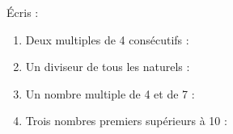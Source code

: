 %
%
    Écris :
    \begin{enumerate}[itemsep=1em]
        \item Deux multiples de 4 consécutifs :
        \item Un diviseur de tous les naturels :
        \item Un nombre multiple de 4 et de 7 :
        \item Trois nombres premiers supérieurs à 10 :
    \end{enumerate}
